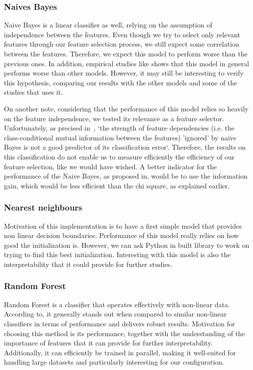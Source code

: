\documentclass{article}
\begin{document}
    \subsubsection{Naives Bayes}
    Naive Bayes is a linear classifier as well, relying on the assumption of independence between the features.
    Even though we try to select only relevant features through our feature selection process, we still expect some correlation between the features.
    Therefore, we expect this model to perform worse than the previous ones.
    In addition, empirical studies like\cite{MLmodelsComparison} shows that this model in general performs worse than other models.
    However, it may still be interesting to verify this hypothesis, comparing our results with the other models and some of the studies that uses it.

    On another note, considering that the performance of this model relies so heavily on the feature independence, we tested its relevance as a feature selector.
    Unfortunately, as precised in~\cite{NaiveBayesBackground}, `the strength of feature dependencies (i.e. the class-conditional mutual information between the features) ’ignored’ by naive Bayes is not a good predictor of its classification error`.
    Therefore, the results on this classification do not enable us to measure efficiently the efficiency of our feature selection, like we would have wished.
    A better indicator for the performance of the Naive Bayes, as proposed in\cite{NaiveBayesBackground}, would be to use the information gain, which would be less efficient than the chi square, as explained earlier. %

    \subsubsection{Nearest neighbours}

    Motivation of this implementation is to have a first simple model that provides non linear decision boundaries.
    Performance of this model really relies on how good the initialization is.
    However, we can ask Python in built library to work on trying to find this best initialization.
    Interesting with this model is also the interpretability that it could provide for further studies.

    \subsubsection{Random Forest}
    Random Forest is a classifier that operates effectively with non-linear data.
    According to\cite{MLmodelsComparison}, it generally stands out when compared to similar non-linear classifiers in terms of performance and delivers robust results.
    Motivation for choosing this method is its performance, together with the understanding of the importance of features that it can provide for further interpretability.
    Additionally, it can efficiently be trained in parallel, making it well-suited for handling large datasets and particularly interesting for our configuration.
\end{document}
